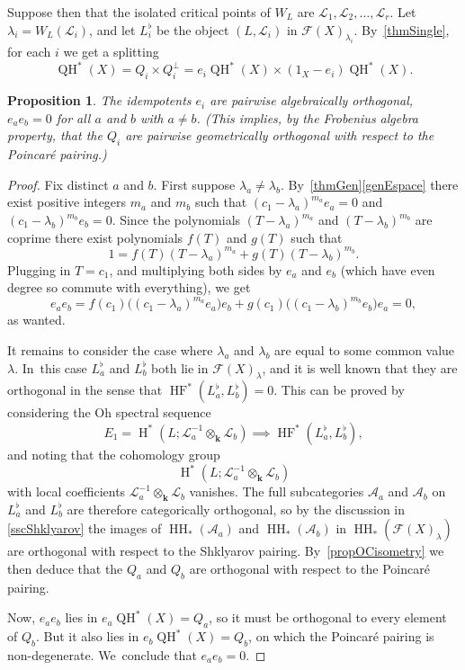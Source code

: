 \documentclass[JEP,XML,SOM,Unicode,NoEqCountersInSection,NoFloatCountersInSection,published]{cedram}
\newtheorem{proposition}[theorem]{Proposition}
\theoremstyle{definition}
\newcommand{\LL}{L^\flat}
\newcommand{\calA}{\mathcal{A}}
\newcommand{\calL}{\mathcal{L}}
\newcommand{\Fuk}{\mathcal{F}}
\newcommand{\kk}{{\boldsymbol{k}}}
\newcommand{\rH}{\operatorname{H}}
\newcommand{\HH}{\operatorname{HH}}
\newcommand{\HF}{\operatorname{HF}}
\newcommand{\QH}{\operatorname{QH}}
\begin{document}
Suppose then that the isolated critical points of $W_L$ are $\calL_1, \calL_2, \dots, \calL_r$. Let $\lambda_i = W_L(\calL_i)$, and let $\LL_i$ be the object $(L, \calL_i)$ in $\Fuk(X)_{\lambda_i}$. By~\cref{thmSingle}, for each $i$ we get a splitting
\[
\QH^*(X) = Q_i \times Q_i^\perp = e_i \QH^*(X) \times (1_X-e_i) \QH^*(X).
\]

\begin{proposition}
\label{propIdempotentsOrthogonal}
The idempotents $e_i$ are pairwise algebraically orthogonal, \ie $e_a e_b = 0$ for all $a$ and $b$ with $a \neq b$. (This implies, by the Frobenius algebra property, that the $Q_i$ are pairwise geometrically orthogonal with respect to the Poincaré pairing.)
\end{proposition}
\begin{proof}
Fix distinct $a$ and $b$. First suppose $\lambda_a \neq \lambda_b$. By~\cref{thmGen}\eqref{genEspace} there exist positive integers $m_a$ and $m_b$ such that $(c_1 - \lambda_a)^{m_a} e_a = 0$ and $(c_1 - \lambda_b)^{m_b} e_b = 0$. Since the polynomials $(T-\lambda_a)^{m_a}$ and $(T-\lambda_b)^{m_b}$ are coprime there exist polynomials $f(T)$ and $g(T)$ such that
\[
1 = f(T)(T-\lambda_a)^{m_a} + g(T)(T-\lambda_b)^{m_b}.
\]
Plugging in $T = c_1$, and multiplying both sides by $e_a$ and $e_b$ (which have even degree so commute with everything), we get
\[
e_a e_b = f(c_1) \big((c_1 -\lambda_a)^{m_a} e_a\big) e_b + g(c_1) \big((c_1 - \lambda_b)^{m_b} e_b\big) e_a = 0,
\]
as wanted.

It remains to consider the case where $\lambda_a$ and $\lambda_b$ are equal to some common value $\lambda$. In~this case $\LL_a$ and $\LL_b$ both lie in $\Fuk(X)_\lambda$, and it is well known that they are orthogonal in the sense that $\HF^*(\LL_a, \LL_b) = 0$. This can be proved by considering the Oh spectral sequence \cite{OhSS}
\[
E_1 = \rH^*(L; \calL_a^{-1} \otimes_\kk \calL_b) \implies \HF^*(\LL_a, \LL_b),
\]
and noting that the cohomology group
\[
\rH^*(L; \calL_a^{-1} \otimes_\kk \calL_b)
\]
with local coefficients $\calL_a^{-1} \otimes_\kk \calL_b$ vanishes. The full subcategories $\calA_a$ and $\calA_b$ on $\LL_a$ and $\LL_b$ are therefore categorically orthogonal, so by the discussion in \cref{sscShklyarov} the images of $\HH_*(\calA_a)$ and $\HH_*(\calA_b)$ in $\HH_*(\Fuk(X)_\lambda)$ are orthogonal with respect to the Shklyarov pairing. By~\cref{propOCisometry} we then deduce that the $Q_a$ and $Q_b$ are orthogonal with respect to the Poincaré pairing.

Now, $e_a e_b$ lies in $e_a \QH^*(X) = Q_a$, so it must be orthogonal to every element of $Q_b$. But it also lies in $e_b \QH^*(X) = Q_b$, on which the Poincaré pairing is non-degenerate. We~conclude that $e_a e_b = 0$.
\end{proof}
\end{document}
